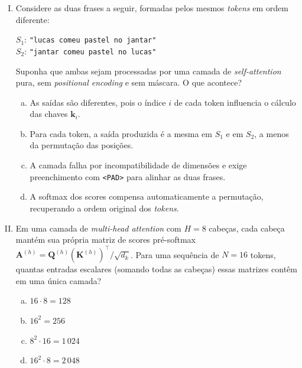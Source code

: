 \documentclass{dlproblemset}
\begin{document}
\begin{enumerate}[I)]
\item Considere as duas frases a seguir, formadas pelos mesmos \textit{tokens}
      em ordem diferente:
\begin{center}
$S_1$: \texttt{"lucas comeu pastel no jantar"} \\
$S_2$: \texttt{"jantar comeu pastel no lucas"}
\end{center}
      Suponha que ambas sejam processadas por uma camada de \textit{self-attention}
      pura, sem \textit{positional encoding} e sem máscara. O que acontece?

\begin{enumerate}[a)]
    \item As saídas são diferentes, pois o índice $i$ de cada token influencia
          o cálculo das chaves $\mathbf{k}_i$.
    \item Para cada token, a saída produzida é a mesma em $S_1$ e em $S_2$,
          a menos da permutação das posições.
    \item A camada falha por incompatibilidade de dimensões e exige preenchimento
          com \texttt{<PAD>} para alinhar as duas frases.
    \item A softmax dos scores compensa automaticamente a permutação,
          recuperando a ordem original dos \textit{tokens}.
\end{enumerate}

\item Em uma camada de \textit{multi-head attention} com $H = 8$ cabeças,
      cada cabeça mantém sua própria matriz de scores pré-softmax
      $\mathbf{A}^{(h)} = \mathbf{Q}^{(h)} (\mathbf{K}^{(h)})^\top / \sqrt{d_k}$. Para uma sequência
      de $N = 16$ tokens, quantas entradas escalares (somando todas as cabeças)
      essas matrizes contêm em uma única camada?

\begin{enumerate}[a)]
    \item $16 \cdot 8 = 128$
    \item $16^2 = 256$
    \item $8^2 \cdot 16 = 1\,024$
    \item $16^2 \cdot 8 = 2\,048$
\end{enumerate}


\end{enumerate}
\end{document}
